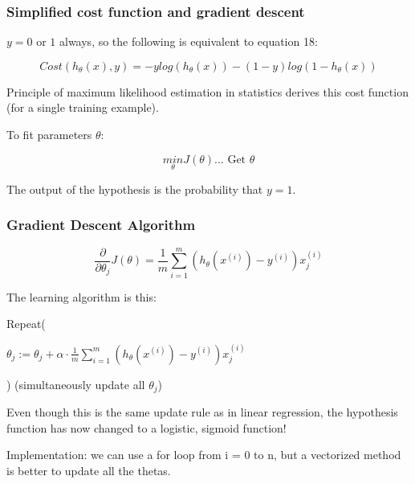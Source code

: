 \documentclass{article}
\begin{document}
\subsubsection{Simplified cost function and gradient descent}
$y=0$ or $1$ always, so the following is equivalent to equation 18:

\begin{equation}
    Cost \left (h_{\theta} (x), y \right) = -y log(h_{\theta} (x)) - (1-y) log \left( 1- h_{\theta} (x) \right)  
\end{equation}

Principle of maximum likelihood estimation in statistics derives this cost function (for a single training example). 


To fit parameters $\theta$:

\begin{equation}
    \underset{\theta}{min} J(\theta) \text{... Get } \theta 
\end{equation}

The output of the hypothesis is the probability that $y=1$.

\newpage

\subsubsection{Gradient Descent Algorithm}


\begin{equation}
    \frac{\partial}{\partial \theta_j} J(\theta) = \frac{1}{m} \sum_{i=1}^m \left(h_{\theta} (x^{(i)})- y^{(i)} \right) x_j^{(i)}
\end{equation}


\begin{myboxb}
The learning algorithm is this:

Repeat(

$\theta_j := \theta_j +\alpha \cdot  \frac{1}{m} \sum_{i=1}^m \left(h_{\theta} (x^{(i)})- y^{(i)} \right) x_j^{(i)}$ 
 
 
) (simultaneously update all $\theta_j$)

\end{myboxb}





Even though this is the same update rule as in linear regression, the hypothesis function has now changed to a logistic, sigmoid function!



Implementation:  we can use a for loop from i = 0 to n, but a vectorized method is better to update all the thetas.
\end{document}
